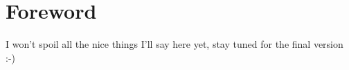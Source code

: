 \chapter*{Foreword}
I won't spoil all the nice things I'll say here yet, stay tuned for the final version :-)